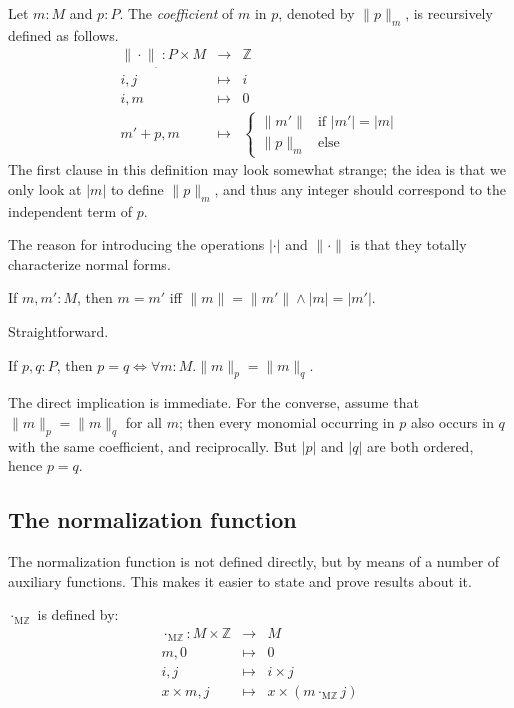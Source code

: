 \documentclass[numreferences]{kluwer}
\newcommand{\Z}{{\mathbb Z}}
\newcommand{\coeff}[2]{\ensuremath{\|#2\|_{#1}}}
\newcommand{\multMZ}{\ensuremath{\cdot_{\mathrm M\Z}}}
\begin{document}
\begin{article}
\begin{definition}\label{defn:coeff}
Let $m:M$ and $p:P$.  The \emph{coefficient} of $m$ in $p$, denoted by
{\coeff mp}, is recursively defined as follows.
\begin{eqnarray*}
\coeff{\underline{\ }}\cdot : P\times M & \to & \Z\\
 i, j & \mapsto & i \\
 i, m & \mapsto & 0 \\
 m'+p, m & \mapsto & \left\{%
\begin{array}{lll}\|m'\| & \mbox{if $|m'|=|m|$} \\ 
 \coeff mp & \mbox{else}\end{array}\right.
\end{eqnarray*}
The first clause in this definition may look somewhat strange; the idea is
that we only look at $|m|$ to define {\coeff mp}, and thus any integer
should correspond to the independent term of $p$.
\end{definition}

The reason for introducing the operations $|\cdot|$ and $\|\cdot\|$ is
that they totally characterize normal forms.

\begin{lemma}\label{monchar}
If $m,m':M$, then $m=m'$ iff $\|m\|=\|m'\| \wedge |m|=|m'|$.
\end{lemma}
\begin{pf}
Straightforward.
\end{pf}

\begin{lemma}\label{polchar}
If $p,q:P$, then $p=q\iff \forall m:M.\coeff pm=\coeff qm$.
\end{lemma}
\begin{pf}
The direct implication is immediate.  For the converse, assume that
$\coeff pm=\coeff qm$ for all $m$; then every monomial occurring in
$p$ also occurs in $q$ with the same coefficient, and reciprocally.
But $|p|$ and $|q|$ are both ordered, hence $p=q$.
\end{pf}

\subsection{The normalization function}\label{normfn}

The normalization function is not defined directly, but by means of a
number of auxiliary functions.  This makes it easier to state and prove
results about it.

\begin{definition}\label{defn:multMZ} {\multMZ} is defined by:
\begin{eqnarray*}
\multMZ : M \times \Z & \to & M \\
 m, 0 & \mapsto & 0 \\
 i, j & \mapsto & i\times j \\
 x\times m, j & \mapsto & x\times (m\multMZ j)
\end{eqnarray*}
\end{definition}


\end{article}
\end{document}
